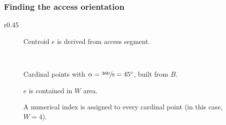             \subsubsection{Finding the access orientation}
                \begin{wrapfigure}{r}{0.45\textwidth}
                    \vspace{-0.08\textheight}
                    \centering
                    \begin{subfigure}[b]{.4\columnwidth}
                        \centering
                        \begin{tikzpicture}[x=2.5pt,y=2.5pt,scale=0.09]
                             
                        \end{tikzpicture}
                        \caption{Centroid $e$ is derived from access segment.}
                        \label{fig:comp-orient-1}
                    \end{subfigure}\\
                    \vspace{0.02\textheight}
                    \begin{subfigure}[b]{.4\columnwidth}
                        \centering
                        \begin{tikzpicture}[x=2.5pt,y=2.5pt,scale=0.09]
                            
                        \end{tikzpicture}
                        \caption{Cardinal points with $\alpha=\sfrac{360}{8}=\SI{45}{\degree}$, built from $B$.}
                        \label{fig:comp-orient-2}
                    \end{subfigure}
                    \vspace{0.02\textheight}
                    \begin{subfigure}[b]{.4\columnwidth}
                        \centering
                        \begin{tikzpicture}[x=2.5pt,y=2.5pt,scale=0.09]
                            
                        \end{tikzpicture}
                        \caption{$e$ is contained in $W$ area.}
                        \label{fig:comp-orient-3}
                    \end{subfigure}
                    \vspace{0.02\textheight}
                    \begin{subfigure}[b]{.4\columnwidth}
                        \centering
                        \begin{tikzpicture}[x=2.5pt,y=2.5pt,scale=0.09]
                            
                        \end{tikzpicture}
                        \caption{A numerical index is assigned to every cardinal point (in this case, $W=4$).}
                        \label{fig:comp-orient-4}
                    \end{subfigure}


\end{wrapfigure}
